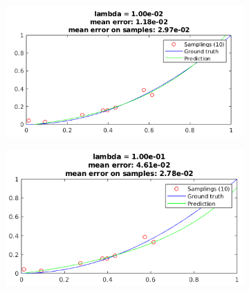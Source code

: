 \documentclass[12pt]{article}
\begin{document}
\begin{figure}[H]
  \centering
  \begin{subfigure}{0.45\textwidth}
    \includegraphics[width=\textwidth]{plots/regression_lambda/lambda_eq_10-2.png}
  \end{subfigure}
  \begin{subfigure}{0.45\textwidth}
    \includegraphics[width=\textwidth]{plots/regression_lambda/lambda_eq_10-1.png}
  \end{subfigure}
\end{figure}
\end{document}
